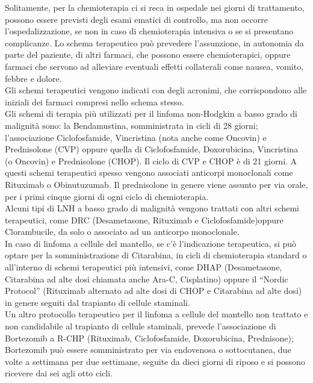 Solitamente, per la chemioterapia ci si reca in ospedale nei giorni di trattamento, possono essere previsti degli 
esami ematici di controllo, ma non occorre l’ospedalizzazione, se non in caso di chemioterapia intensiva o se si 
presentano complicanze. 
Lo schema terapeutico può prevedere l’assunzione, in autonomia da parte del paziente, di altri farmaci, 
che possono essere chemioterapici, oppure farmaci che servono ad alleviare eventuali effetti collaterali 
come nausea, vomito, febbre e dolore\cite{LOWGRADE}.\\
Gli schemi terapeutici vengono indicati con degli acronimi, che corrispondono alle iniziali dei farmaci compresi nello 
schema stesso.\\ Gli schemi di terapia più utilizzati per il linfoma non-Hodgkin a basso grado di malignità sono: 
la Bendamustina, somministrata in cicli di 28 giorni; l’associazione  Ciclofosfamide, Vincristina (nota anche come 
Oncovin) e Prednisolone (CVP) oppure quella di Ciclofosfamide, Doxorubicina, Vincristina (o Oncovin) e Prednisolone 
(CHOP). Il ciclo di CVP e CHOP è di 21 giorni. A questi schemi terapeutici spesso vengono associati anticorpi 
monoclonali come Rituximab o Obinutuzumab. Il prednisolone in genere viene assunto per via orale, per i primi cinque 
giorni di ogni ciclo di chemioterapia.\\
Alcuni tipi di LNH a basso grado di malignità vengono trattati con altri schemi terapeutici, come DRC 
(Desametasone, Rituximab e Ciclofosfamide)oppure Clorambucile, da solo o associato ad un anticorpo monoclonale\cite{LOWGRADE}.\\
In caso di linfoma a cellule del mantello, se c’è l’indicazione terapeutica, si può optare per la somministrazione di 
Citarabina, in cicli di chemioterapia standard o all’interno di schemi terapeutici più intensivi, come DHAP 
(Desametasone, Citarabina ad alte dosi chiamata anche Ara-C, Cisplatino) oppure il “Nordic Protocol” (Rituximab 
alternato ad alte dosi di CHOP e Citarabina ad alte dosi) in genere seguiti dal trapianto di cellule 
staminali\cite{LOWGRADE}.\\
Un altro protocollo terapeutico per il linfoma a cellule del mantello non trattato e non candidabile al trapianto di 
cellule staminali, prevede l’associazione di Bortezomib a R-CHP (Rituximab, Ciclofosfamide, Doxorubicina, Prednisone); 
Bortezomib può essere somministrato per via endovenosa o sottocutanea, due volte a settimana per due settimane, 
seguite da dieci giorni di riposo e si possono ricevere dai sei agli otto cicli\cite{LOWGRADE}.

